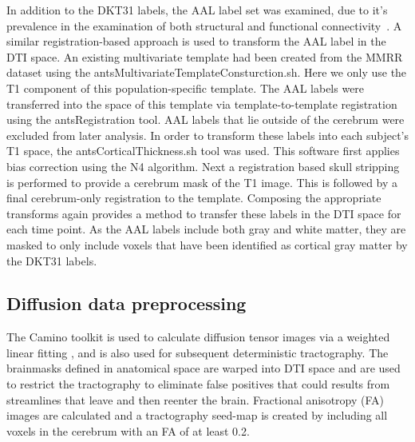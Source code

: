 \documentclass{frontiersSCNS} %
\begin{document}
In addition to the DKT31 labels, the AAL label set was examined, due to it's prevalence in
the examination of both structural and functional connectivity~\citep{Tzourio-Mazoyer2002}. 
A similar registration-based approach is used to transform the AAL label in the DTI space.
An existing multivariate template had been created from the MMRR dataset using the
antsMultivariateTemplateConsturction.sh. Here we only use the T1 component of this
population-specific template. The AAL labels were transferred into the space of this template
via template-to-template registration using the antsRegistration tool. AAL labels that lie outside
of the cerebrum were excluded from later analysis. In order to transform these labels into each 
subject's T1 space, the antsCorticalThickness.sh tool was used. This software first applies bias
correction using the N4 algorithm. Next a registration based skull stripping is performed to provide
a cerebrum mask of the T1 image. This is followed by a final cerebrum-only registration to the template.
Composing the appropriate transforms again provides a method to transfer these labels in the DTI space for each time point. 
As the AAL labels include both gray and white matter, they are masked to only include voxels 
that have been identified as cortical gray matter by the DKT31 labels.




\subsection{Diffusion data preprocessing}
The Camino toolkit \citep{} is used to calculate diffusion tensor images via a
weighted linear fitting \citep{Basser1994,Salvador2005}, and is also
used for subsequent deterministic tractography. The brainmasks defined
in anatomical space are warped into DTI space and are used to restrict the
tractography to eliminate false positives that could results from
streamlines that leave and then reenter the brain. Fractional anisotropy (FA) images are calculated and a
tractography seed-map is created by including all voxels in the cerebrum with an FA of at
least 0.2. 
\end{document}
